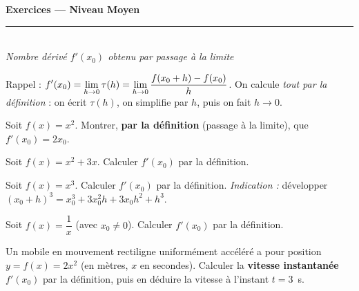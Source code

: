 \pagestyle{fancy}\fancyhf{}
\fancyfoot[C]{\small\thepage}
\renewcommand{\headrulewidth}{0.8pt}



\begin{center}
{\LARGE\bfseries\color{primarydark} Exercices — Niveau Moyen}\\[2pt]
{\color{primary}\rule{0.5\textwidth}{1.2pt}}\\[4pt]
{\small\itshape Nombre dérivé $f'(x_0)$ obtenu par passage à la limite}
\end{center}
\vspace{2mm}

\begin{cle}
Rappel : $\displaystyle f'(x_0)=\lim_{h\to 0} \tau(h)=\lim_{h\to 0} \frac{f(x_0+h)-f(x_0)}{h}$.
On calcule \emph{tout par la définition} : on écrit $\tau(h)$, on simplifie par $h$,
puis on fait $h\to 0$.
\end{cle}

\begin{exo}[1]
Soit $f(x)=x^2$. Montrer, \textbf{par la définition} (passage à la limite),
que $f'(x_0)=2x_0$.
\end{exo}

\begin{exo}[2]
Soit $f(x)=x^2+3x$. Calculer $f'(x_0)$ par la définition.
\end{exo}

\begin{exo}[3]
Soit $f(x)=x^3$. Calculer $f'(x_0)$ par la définition.
\emph{Indication :} développer $(x_0+h)^3=x_0^3+3x_0^2h+3x_0h^2+h^3$.
\end{exo}

\begin{exo}[4]
Soit $f(x)=\dfrac{1}{x}$ (avec $x_0\neq 0$). Calculer $f'(x_0)$ par la définition.
\end{exo}

\begin{exo}[5]
Un mobile en mouvement rectiligne uniformément accéléré a pour position
$y=f(x)=2x^2$ (en mètres, $x$ en secondes). Calculer la \textbf{vitesse instantanée}
$f'(x_0)$ par la définition, puis en déduire la vitesse à l'instant $t=3$~s.
\end{exo}


